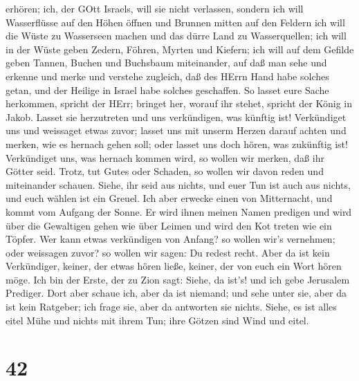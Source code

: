 erhören; ich, der GOtt Israels, will sie nicht verlassen, 
sondern ich will Wasserflüsse auf den Höhen öffnen und Brunnen mitten
auf den Feldern ich will die Wüste zu Wasserseen machen und das dürre
Land zu Wasserquellen;  ich will in der Wüste geben Zedern,
Föhren, Myrten und Kiefern; ich will auf dem Gefilde geben Tannen,
Buchen und Buchsbaum miteinander,  auf daß man sehe und
erkenne und merke und verstehe zugleich, daß des HErrn Hand habe solches
getan, und der Heilige in Israel habe solches geschaffen. 
So lasset eure Sache herkommen, spricht der HErr; bringet her, worauf
ihr stehet, spricht der König in Jakob.  Lasset sie
herzutreten und uns verkündigen, was künftig ist! Verkündiget uns und
weissaget etwas zuvor; lasset uns mit unserm Herzen darauf achten und
merken, wie es hernach gehen soll; oder lasset uns doch hören, was
zukünftig ist!  Verkündiget uns, was hernach kommen wird,
so wollen wir merken, daß ihr Götter seid. Trotz, tut Gutes oder
Schaden, so wollen wir davon reden und miteinander schauen.
 Siehe, ihr seid aus nichts, und euer Tun ist auch aus
nichts, und euch wählen ist ein Greuel.  Ich aber erwecke
einen von Mitternacht, und kommt vom Aufgang der Sonne. Er wird ihnen
meinen Namen predigen und wird über die Gewaltigen gehen wie über Leimen
und wird den Kot treten wie ein Töpfer.  Wer kann etwas
verkündigen von Anfang? so wollen wir's vernehmen; oder weissagen zuvor?
so wollen wir sagen: Du redest recht. Aber da ist kein Verkündiger,
keiner, der etwas hören ließe, keiner, der von euch ein Wort hören möge.
 Ich bin der Erste, der zu Zion sagt: Siehe, da ist's! und
ich gebe Jerusalem Prediger.  Dort aber schaue ich, aber da
ist niemand; und sehe unter sie, aber da ist kein Ratgeber; ich frage
sie, aber da antworten sie nichts.  Siehe, es ist alles
eitel Mühe und nichts mit ihrem Tun; ihre Götzen sind Wind und eitel.

\hypertarget{section-41}{%
\section{42}\label{section-41}}

